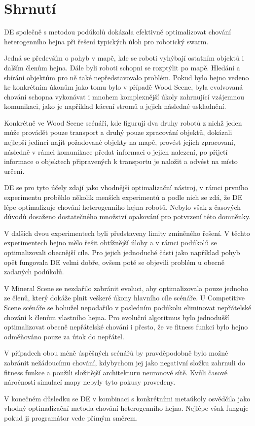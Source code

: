 \section{Shrnutí}
DE společně s metodou podúkolů dokázala efektivně optimalizovat chování heterogenního hejna při řešení typických úloh pro robotický swarm. 
\par 
Jedná se především o pohyb v mapě, kde se roboti vyhýbají ostatním objektů i dalším členům hejna. Dále byli roboti schopni se rozptýlit po mapě. Hledání a sbírání objektům pro ně také nepředstavovalo problém. Pokud bylo hejno vedeno ke konkrétním úkonům jako tomu bylo v případě Wood Scene, byla evolvovaná chování schopna vykonávat i mnohem komplexnější úkoly zahrnující vzájemnou komunikaci, jako je například kácení stromů a jejich následné uskladnění. \par 
Konkrétně ve Wood Scene scénáři, kde figurují dva druhy robotů z nichž jeden může provádět pouze transport a druhý pouze zpracování objektů, dokázali nejlepší jedinci najít požadované objekty na mapě, provést jejich zpracovaní, následně v rámci komunikace předat informaci o jejich nalezení, po přijetí informace o objektech připravených k transportu je naložit a odvést na místo určení.   
\par
DE se pro tyto účely zdají jako vhodnější optimalizační nástroj, v rámci prvního experimentu proběhlo několik menších experimentů a podle nich se zdá, že DE lépe optimalizuje chování heterogenního hejna robotů. Nebylo však z časových důvodů dosaženo dostatečného množství opakování pro potvrzení této domněnky. 
\par
V dalších dvou experimentech byli představeny limity zmíněného řešení. V těchto experimentech hejno mělo řešit obtížnější úlohy a v rámci podúkolů se optimalizovali obecnější cíle. Pro jejich jednoduché části jako například pohyb opět fungovala DE velmi dobře, ovšem poté se objevili problém u obecně zadaných podúkolů. 
\par 
V Mineral Scene se nezdařilo zabránit evoluci, aby optimalizovala pouze jednoho ze členů, který dokáže plnit veškeré úkony hlavního cíle scénáře. U Competitive Scene scénáře se bohužel nepodařilo v posledním podúkolu eliminovat nepřátelské chování k členům vlastního hejna. Pro evoluční algoritmus bylo jednodušší optimalizovat obecně nepřátelské chování i přesto, že ve fitness funkci bylo hejno odměňováno pouze za útok do nepřátel. 
\par 
V případech obou méně úspěšných scénářů by pravděpodobně bylo možné zabránit nežádoucímu chování, kdybychom jej jako negativní složku zahrnuli do fitness funkce a použili složitější architekturu neuronové sítě. Kvůli časové náročnosti simulací mapy nebyly tyto pokusy provedeny. 
\par
V konečném důsledku se DE v kombinaci s konkrétními metaúkoly osvědčila jako vhodný optimalizační metoda chování heterogenního hejna. Nejlépe však funguje pokud ji programátor vede přímým směrem. 